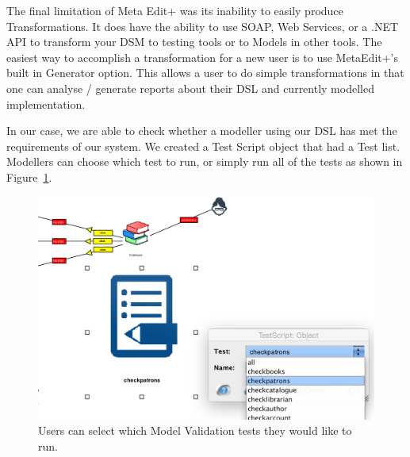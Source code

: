 The final limitation of Meta Edit+ was its inability to easily produce Transformations.  It does have the ability to use SOAP, Web Services, or a .NET API to transform your DSM to testing tools or to Models in other tools.  The easiest way to accomplish a transformation for a new user is to use MetaEdit+'s built in Generator option.  This allows a user to do simple transformations in that one can analyse / generate reports about their DSL and currently modelled implementation.\par 
In our case, we are able to check whether a modeller using our DSL has met the requirements of our system.  We created a Test Script object that had a Test list.  Modellers can choose which test to run, or simply run all of the tests as shown in Figure~\ref{fig:transform_script}.\par

  \begin{figure}[h]
    \centering
    \includegraphics[scale=0.3]{images/transform_script.png}
    \caption{Users can select which Model Validation tests they would like to run.}
    \label{fig:transform_script}
  \end{figure} 
  
